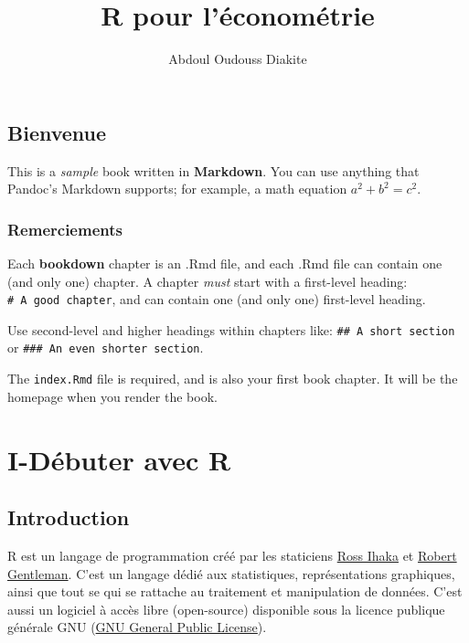 \documentclass[
]{book}
\title{R pour l'économétrie}
\author{Abdoul Oudouss Diakite}
\date{}
\theoremstyle{definition}
\theoremstyle{definition}
\theoremstyle{definition}
\theoremstyle{definition}
\theoremstyle{remark}
\begin{document}
\maketitle

{
\setcounter{tocdepth}{1}
\tableofcontents
}
\hypertarget{bienvenue}{%
\chapter*{Bienvenue}\label{bienvenue}}

This is a \emph{sample} book written in \textbf{Markdown}. You can use anything that Pandoc's Markdown supports; for example, a math equation \(a^2 + b^2 = c^2\).

\hypertarget{remerciements}{%
\section*{Remerciements}\label{remerciements}}

Each \textbf{bookdown} chapter is an .Rmd file, and each .Rmd file can contain one (and only one) chapter. A chapter \emph{must} start with a first-level heading: \texttt{\#\ A\ good\ chapter}, and can contain one (and only one) first-level heading.

Use second-level and higher headings within chapters like: \texttt{\#\#\ A\ short\ section} or \texttt{\#\#\#\ An\ even\ shorter\ section}.

The \texttt{index.Rmd} file is required, and is also your first book chapter. It will be the homepage when you render the book.

\hypertarget{part-i-duxe9buter-avec-r}{%
\part{I-Débuter avec R}\label{part-i-duxe9buter-avec-r}}

\hypertarget{intro1}{%
\chapter{Introduction}\label{intro1}}

R est un langage de programmation créé par les staticiens \href{https://en.wikipedia.org/wiki/Ross_Ihaka}{Ross Ihaka} et \href{https://en.wikipedia.org/wiki/Robert_Gentleman_(statistician)}{Robert Gentleman}.
C'est un langage dédié aux statistiques, représentations graphiques, ainsi que tout se qui se rattache au traitement et manipulation de données. C'est aussi un logiciel à accès libre (open-source) disponible sous la licence publique générale GNU (\href{https://en.wikipedia.org/wiki/GNU_General_Public_License}{GNU General Public License}).
\end{document}
